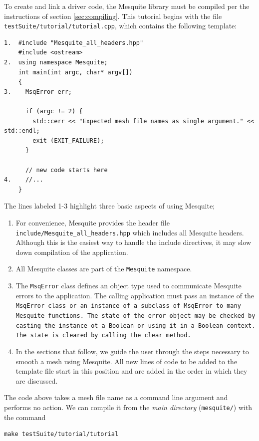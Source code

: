 To create and link a driver code, the Mesquite library must be
compiled per the instructions of section \ref{sec:compiling}. 
This tutorial begins with the file \newline
\texttt{testSuite/tutorial/tutorial.cpp}, 
which contains the following template:
\begin{verbatim}
1.  #include "Mesquite_all_headers.hpp"
    #include <ostream>
2.  using namespace Mesquite;
    int main(int argc, char* argv[])
    {
3.    MsqError err;

      if (argc != 2) {
        std::cerr << "Expected mesh file names as single argument." << std::endl;
        exit (EXIT_FAILURE);
      }

      // new code starts here
4.    //... 
    }
\end{verbatim}
The lines labeled 1-3 highlight three basic aspects of using Mesquite;
\begin{enumerate}
\item For convenience, Mesquite provides the header file
\texttt{include/Mesquite\_all\_headers.hpp} which includes all Mesquite
headers. Although this is the easiest way to handle the include directives,
it may slow down compilation of the application.  
\item All Mesquite classes are part of the \texttt{Mesquite} namespace. 

\item  The \texttt{MsqError} class defines an object type used to communicate
Mesquite errors to the application.  The calling application must pass
an instance of the \tt{MsqError} class or an instance of a subclass of
\tt{MsqError} to many Mesquite functions.  The state of the error object
may be checked by casting the instance ot a Boolean or using it in a 
Boolean context.  The state is cleared by calling the \tt{clear} method.
\item In the sections that follow, we guide the user through the steps
necessary to smooth a mesh using Mesquite.  All new lines of code to be
added to the template file start in this position and are added in the order
in which they are discussed.
\end{enumerate}

The code above takes a mesh file name as a command line argument and
performs no action. We can compile it from the {\it main directory}
(\texttt{mesquite/}) with the command 
\begin{verbatim}
make testSuite/tutorial/tutorial
\end{verbatim}

